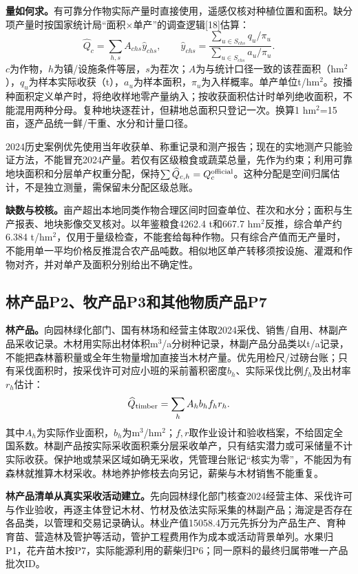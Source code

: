 \documentclass[12pt,a4paper,fontset=fandol]{ctexart}
\begin{document}
\textbf{量如何求。}有可靠分作物实际产量时直接使用，遥感仅核对种植位置和面积。缺分项产量时按国家统计局“面积×单产”的调查逻辑[18]估算：
\begin{equation}
 \widehat Q_c=\sum_{h,s}A_{chs}\widehat y_{chs},\qquad
 \widehat y_{chs}=\frac{\sum_{u\in S_{chs}}q_u/\pi_u}{\sum_{u\in S_{chs}}a_u/\pi_u}.
\end{equation}
$c$为作物，$h$为镇/设施条件等层，$s$为茬次；$A$为与统计口径一致的该茬面积（hm$^2$），$q_u$为样本实际收获（t），$a_u$为样本面积，$\pi_u$为入样概率。单产单位t/hm$^2$。按播种面积定义单产时，将绝收样地零产量纳入；按收获面积估计时单列绝收面积，不能混用两种分母。复种地块逐茬计，但耕地总面积只登记一次。换算1 hm$^2$=15亩，逐产品统一鲜/干重、水分和计量口径。

2024历史案例优先使用当年收获单、称重记录和测产报告；现在的实地测产只能验证方法，不能冒充2024产量。若仅有区级粮食或蔬菜总量，先作为约束；利用可靠地块面积和分层单产权重分配，保持$\sum\widehat Q_{c,h}=Q_c^{\rm official}$。这种分配是空间归属估计，不是独立测量，需保留未分配区级总账。

\textbf{缺数与校核。}亩产超出本地同类作物合理区间时回查单位、茬次和水分；面积与生产报表、地块影像交叉核对。以年鉴粮食4262.4 t和667.7 hm$^2$反推，综合单产约6.384 t/hm$^2$，仅用于量级检查，不能套给每种作物。只有综合产值而无产量时，不能用单一平均价格反推混合农产品吨数。相似地区单产转移须按设施、灌溉和作物对齐，并对单产及面积分别给出不确定性。

\subsection{林产品P2、牧产品P3和其他物质产品P7}
\textbf{林产品。}向园林绿化部门、国有林场和经营主体取2024采伐、销售/自用、林副产品采收记录。木材用实际出材体积m$^3$/a分树种记录，林副产品分品类以t/a记录，不能把森林蓄积量或全年生物量增加直接当木材产量。优先用检尺/过磅台账；只有采伐面积时，按采伐许可对应小班的采前蓄积密度$b_h$、实际采伐比例$f_h$及出材率$r_h$估计：
\begin{equation}
 \widehat Q_{\rm timber}=\sum_h A_h b_h f_h r_h.
\end{equation}
其中$A_h$为实际作业面积，$b_h$为m$^3$/hm$^2$；$f,r$取作业设计和验收档案，不给固定全国系数。林副产品按实际采收面积乘分层采收单产，只有结实潜力或可采储量不计实际收获。保护地或禁采区域如确无采收，凭管理台账记“核实为零”，不能因为有森林就推算木材采收。林地养护修枝去向另记，薪柴与木材销售不能重复。

\textbf{林产品清单从真实采收活动建立。}先向园林绿化部门核查2024经营主体、采伐许可与作业验收，再逐主体登记木材、竹材及依法实际采集的林副产品；海淀是否存在各品类，以管理和交易记录确认。林业产值15058.4万元先拆分为产品生产、育种育苗、营造林及管护等活动，管护工程费用作为成本或活动背景单列。水果归P1，花卉苗木按P7，实际能源利用的薪柴归P6；同一原料的最终归属带唯一产品批次ID。
\end{document}
